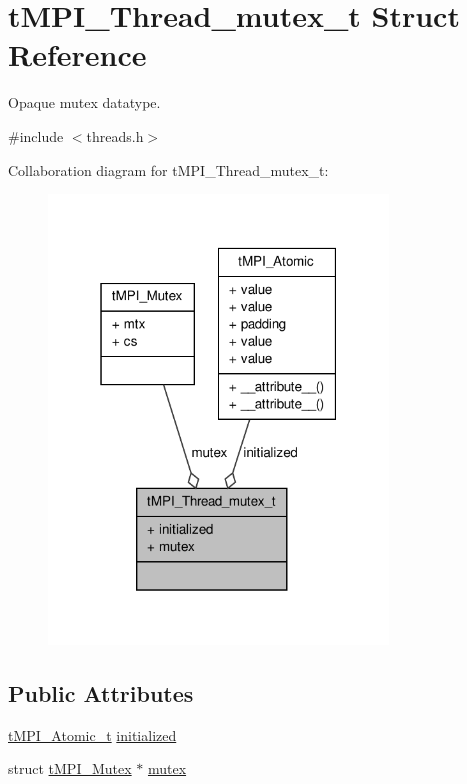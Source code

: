 \hypertarget{structtMPI__Thread__mutex__t}{\section{t\-M\-P\-I\-\_\-\-Thread\-\_\-mutex\-\_\-t \-Struct \-Reference}
\label{structtMPI__Thread__mutex__t}
}


\-Opaque mutex datatype.  




{\ttfamily \#include $<$threads.\-h$>$}



\-Collaboration diagram for t\-M\-P\-I\-\_\-\-Thread\-\_\-mutex\-\_\-t\-:
\nopagebreak
\begin{figure}[H]
\begin{center}
\leavevmode
\includegraphics[width=256pt]{structtMPI__Thread__mutex__t__coll__graph}
\end{center}
\end{figure}
\subsection*{\-Public \-Attributes}
\begin{DoxyCompactItemize}
\item 
\hyperlink{include_2thread__mpi_2atomic_2gcc_8h_a2c33794dc540e3b07cffc1f81a3fe4b4}{t\-M\-P\-I\-\_\-\-Atomic\-\_\-t} \hyperlink{structtMPI__Thread__mutex__t_a850c9d224914a4d977bf5afa4a0eb01d}{initialized}
\item 
struct \hyperlink{structtMPI__Mutex}{t\-M\-P\-I\-\_\-\-Mutex} $\ast$ \hyperlink{structtMPI__Thread__mutex__t_a56ff5161c009dd721aef5a841701c27b}{mutex}
\end{DoxyCompactItemize}


